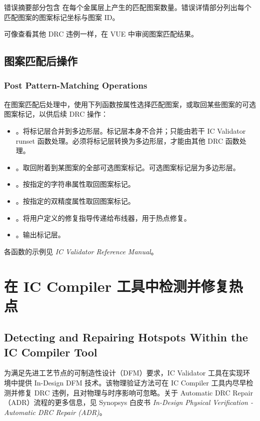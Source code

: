 错误摘要部分包含  在每个金属层上产生的匹配图案数量。错误详情部分列出每个匹配图案的图案标记坐标与图案 ID。

可像查看其他 DRC 违例一样，在 VUE 中审阅图案匹配结果。

\subsection{图案匹配后操作}
\subsubsection*{Post Pattern-Matching Operations}

在图案匹配后处理中，使用下列函数按属性选择匹配图案，或取回某些图案的可选图案标记，以供后续 DRC 操作：
\begin{itemize}
  \item {}。将标记层合并到多边形层。标记层本身不合并；只能由若干 IC Validator runset 函数处理。必须将标记层转换为多边形层，才能由其他 DRC 函数处理。
  \item {}。取回附着到某图案的全部可选图案标记。可选图案标记层为多边形层。
  \item {}。按指定的字符串属性取回图案标记。
  \item {}。按指定的双精度属性取回图案标记。
  \item {}。将用户定义的修复指导传递给布线器，用于热点修复。
  \item {}。输出标记层。
\end{itemize}

\begin{seeAlsoBox}
各函数的示例见 \textit{IC Validator Reference Manual}。
\end{seeAlsoBox}

\section{在 IC Compiler 工具中检测并修复热点}
\subsection*{Detecting and Repairing Hotspots Within the IC Compiler Tool}

为满足先进工艺节点的可制造性设计（DFM）要求，IC Validator 工具在实现环境中提供 In-Design DFM 技术。该物理验证方法可在 IC Compiler 工具内尽早检测并修复 DRC 违例，且对物理与时序影响可忽略。关于 Automatic DRC Repair（ADR）流程的更多信息，见 Synopsys 白皮书 \textit{In-Design Physical Verification - Automatic DRC Repair (ADR)}。


